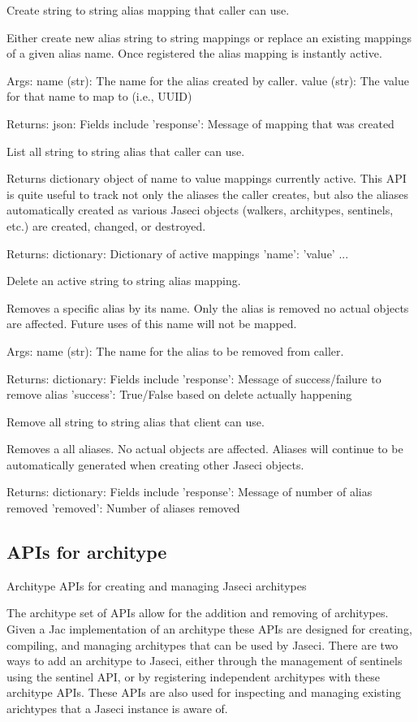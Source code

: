 {Create string to string alias mapping that caller can use.

Either create new alias string to string mappings or replace
an existing mappings of a given alias name. Once registered the
alias mapping is instantly active.

Args:
    name (str): The name for the alias created by caller.
    value (str): The value for that name to map to (i.e., UUID)

Returns:
    json: Fields include
        'response': Message of mapping that was created}
{List all string to string alias that caller can use.

Returns dictionary object of name to value mappings currently active.
This API is quite useful to track not only the aliases the caller
creates, but also the aliases automatically created as various Jaseci
objects (walkers, architypes, sentinels, etc.) are created, changed,
or destroyed.

Returns:
    dictionary: Dictionary of active mappings
        'name': 'value'
        ...}
{Delete an active string to string alias mapping.

Removes a specific alias by its name. Only the alias is removed no
actual objects are affected. Future uses of this name will not be
mapped.

Args:
    name (str): The name for the alias to be removed from caller.

Returns:
    dictionary: Fields include
        'response': Message of success/failure to remove alias
        'success': True/False based on delete actually happening}
{Remove all string to string alias that client can use.

Removes a all aliases. No actual objects are affected. Aliases will
continue to be automatically generated when creating other Jaseci
objects.

Returns:
    dictionary: Fields include
        'response': Message of number of alias removed
        'removed': Number of aliases removed}
\subsection{APIs for architype}

Architype APIs for creating and managing Jaseci architypes
\par
The architype set of APIs allow for the addition and removing of
architypes. Given a Jac implementation of an architype these APIs are
designed for creating, compiling, and managing architypes that can be
used by Jaseci. There are two ways to add an architype to Jaseci, either
through the management of sentinels using the sentinel API, or by
registering independent architypes with these architype APIs. These
APIs are also used for inspecting and managing existing arichtypes that
a Jaseci instance is aware of.


